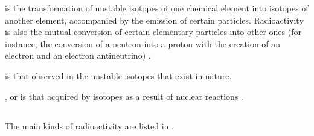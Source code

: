 is the transformation of unstable isotopes  of one chemical element into isotopes of another element, accompanied by the emission of certain particles. Radioactivity  is also the mutual conversion of certain elementary particles into other ones (for instance, the conversion of a neutron into a proton with the creation of an electron and an electron antineutrino) .

 is that observed in the unstable isotopes that exist in nature.

, or  is that acquired by isotopes as a result of nuclear reactions .


\subsection{}\label{42.4.2} The main kinds of radioactivity are listed in .



